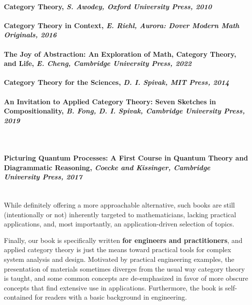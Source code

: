 \documentclass[10pt, article, one side]{memoir}
\begin{document}
    \paragraph{Category Theory, \emph{S.
            Awodey, Oxford University Press, 2010}}

    \paragraph{Category Theory in Context, \emph{E.
            Riehl, Aurora: Dover Modern Math Originals, 2016}}

    \paragraph{The Joy of Abstraction: An Exploration of Math, Category Theory, and Life, \emph{E.
            Cheng, Cambridge University Press, 2022}}

    \paragraph{Category Theory for the Sciences, \emph{D.
            I.
            Spivak, MIT Press, 2014}}

    \paragraph{An Invitation to Applied Category Theory: Seven Sketches in Compositionality, \emph{B.
            Fong, D.
            I.
            Spivak, Cambridge University Press, 2019}
    }

    \
    \\

    \paragraph{Picturing Quantum Processes: A First Course in Quantum Theory and Diagrammatic Reasoning, \emph{Coecke and Kissinger, Cambridge University Press, 2017}}

    \
    \\

    While definitely offering a more approachable alternative, such books are still (intentionally or not) inherently targeted to mathematicians, lacking practical applications, and, most importantly, an application-driven selection of topics.

    Finally, our book is specifically written \textbf{for engineers and practitioners}, and applied category theory is just the means toward practical tools for complex system analysis and design.
    Motivated by practical engineering examples, the presentation of materials sometimes diverges from the usual way category theory is taught, and some common concepts are de-emphasized in favor of more obscure concepts that find extensive use in applications.
    Furthermore, the book is self-contained for readers with a basic background in engineering.
\end{document}
